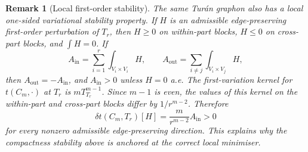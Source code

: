 \documentclass[11pt]{article}
\newtheorem{remark}[theorem]{Remark}
\begin{document}
\begin{remark}[Local first-order stability]
The same Tur\'an graphon also has a local one-sided variational stability
property.  If \(H\) is an admissible edge-preserving first-order perturbation of
\(T_r\), then \(H\ge0\) on within-part blocks, \(H\le0\) on cross-part blocks,
and \(\int H=0\).  If
\[
        A_{\mathrm{in}}=
        \sum_{i=1}^r\int_{V_i\times V_i} H,
        \qquad
        A_{\mathrm{out}}=
        \sum_{i\ne j}\int_{V_i\times V_j} H,
\]
then \(A_{\mathrm{out}}=-A_{\mathrm{in}}\), and \(A_{\mathrm{in}}>0\) unless
\(H=0\) a.e.  The first-variation kernel for \(t(C_m,\cdot)\) at \(T_r\) is
\(mT_{T_r}^{m-1}\).  Since \(m-1\) is even, the values of this kernel on the
within-part and cross-part blocks differ by \(1/r^{m-2}\).  Therefore
\[
        \delta t(C_m,T_r)[H]
        =\frac{m}{r^{m-2}}A_{\mathrm{in}}>0
\]
for every nonzero admissible edge-preserving direction.  This explains why the
compactness stability above is anchored at the correct local minimiser.
\end{remark}
\end{document}
